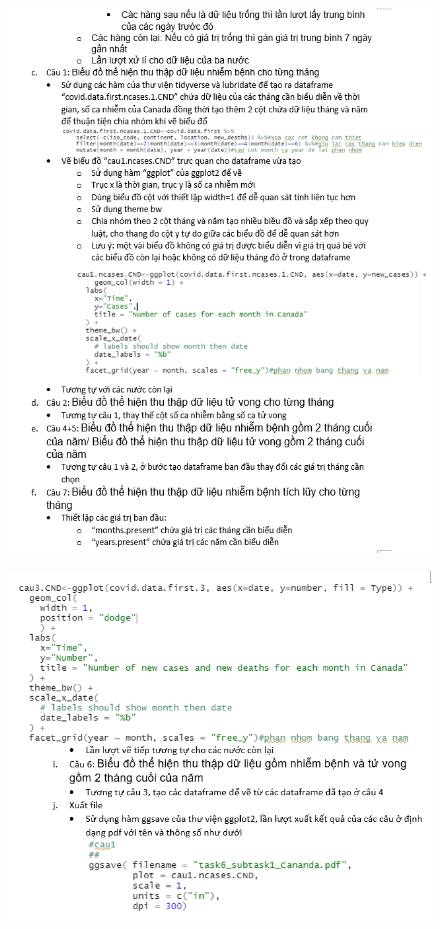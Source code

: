 \documentclass[a4paper]{article}
\theoremstyle{definition}
\begin{document}
\begin{enumerate}[i)]
\begin{figure}[H]
		\end{figure}
		\begin{figure}[H]
		    \centering
			\includegraphics{images/6.0.2.png}
		\end{figure}
		\begin{figure}[H]
		    \centering
			\includegraphics{images/6.0.3.png}
		\end{figure}
		

\end{enumerate}
\end{document}
